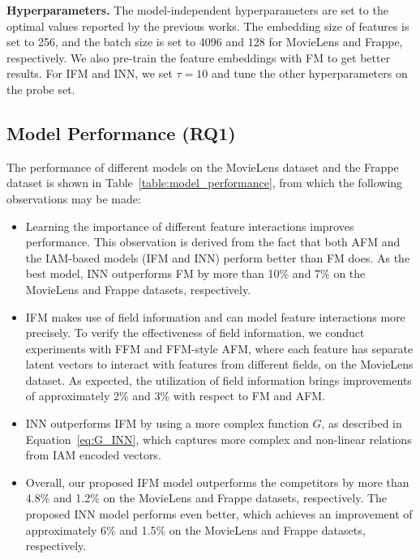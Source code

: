 \documentclass[letterpaper]{article} \usepackage{aaai19}  \usepackage{times}  \usepackage{helvet}  \usepackage{courier}  \usepackage{url}  \usepackage{graphicx}  \frenchspacing  \setlength{\pdfpagewidth}{8.5in}  \setlength{\pdfpageheight}{11in}  \usepackage{mathtools}
\begin{document}
\textbf{Hyperparameters.} The model-independent hyperparameters are set to the optimal values reported by the previous works\cite{xiaoattentional,he2017neural}. The embedding size of features is set to 256, and the batch size is set to 4096 and 128 for MovieLens and Frappe, respectively. We also pre-train the feature embeddings
with FM to get better results. For IFM and INN, we set $\tau=10$ and tune the other hyperparameters on the probe set. 




\subsection{Model Performance (\textbf{RQ1})}

The performance of different models on the MovieLens dataset and the Frappe dataset is shown in Table~\ref{table:model_performance}, from which the following observations may be made:
\begin{itemize}
\item Learning the importance of different feature interactions improves performance. This observation is derived from the fact that both AFM and the IAM-based models (IFM and INN) perform better than FM does. As the best model, INN outperforms FM by more than 10\% and 7\% on the MovieLens and Frappe datasets, respectively.
\item IFM makes use of field information and can model feature interactions more precisely. To verify the effectiveness of field information, we conduct experiments with FFM and FFM-style AFM, where each feature has separate latent vectors to interact with features from different fields, on the MovieLens dataset. As expected, the utilization of field information brings improvements of approximately 2\% and 3\% with respect to FM and AFM. 
\item INN outperforms IFM by using a more complex function $G$, as described in Equation~\ref{eq:G_INN}, which captures more complex and non-linear relations from IAM encoded vectors. 
\item Overall, our proposed IFM model outperforms the competitors by more than 4.8\% and 1.2\% on the MovieLens and Frappe datasets, respectively. The proposed INN model performs even better, which achieves an improvement of approximately 6\% and 1.5\% on the MovieLens and Frappe datasets, respectively.
\end{itemize}
\end{document}
